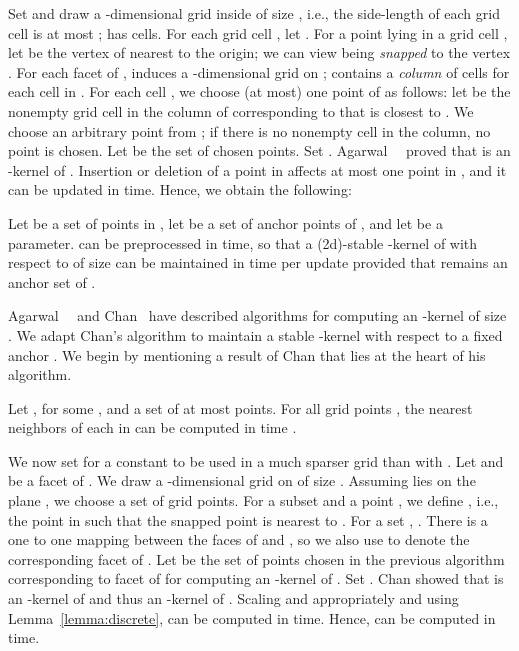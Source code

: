 \documentclass[11pt]{myclass}
\begin{document}
Set  and draw a -dimensional grid  inside
 of size , i.e., the side-length of each grid cell is
at most ;  has  cells. For each grid
cell , let . For a point  lying 
in a grid cell , 
let  be the vertex of  nearest to the origin; we can
view  being \emph{snapped} to the vertex .
For each facet  of ,
 induces a -dimensional grid  on ;  contains
a \emph{column} of cells for each cell in . For 
each cell , we choose (at most) one point of  
as follows:
let  be the nonempty grid cell in the column of  
corresponding to  that is closest to . We choose an 
arbitrary point from ;
if there is no nonempty cell in the column, no point is chosen. Let
 be the set of chosen points. Set . Agarwal~\etal~\cite{AHV04} proved that 
 is an -kernel of .  Insertion or deletion of a point
in  affects at most one point in , and it can be updated in 
 time. Hence, we obtain the following:

\begin{lemma}
Let  be a set of  points in , let 
 be a set of anchor points of , and let 
be a parameter.   can be preprocessed in  time,
so that a (2d)-stable -kernel of  with respect to  of 
size  can be maintained in  time 
per update provided that  remains an anchor set of .
\label{lem:weak-fixed}
\end{lemma}


Agarwal~\etal~\cite{AHV04} and Chan~\cite{Cha06} have described algorithms for 
computing an -kernel of size . We adapt Chan's 
algorithm to maintain a stable -kernel with respect to a 
fixed anchor . We begin by mentioning a result of Chan that lies 
at the heart of his algorithm.

\begin{lemma}
\label{lemma:discrete}
Let ,  for some , and
 a set of at most  points. For all grid points , the nearest
neighbors of each  in  can be computed in time .
\end{lemma}

We now set  for a constant  to be used in a much sparser grid than with . 
Let  and  be a facet of . 
We draw a -dimensional grid on  of size . 
Assuming  lies on the plane , we choose a set  of grid points.
For a subset  and a point , we define , i.e., the point in  such that the snapped point is nearest to . 
For a set , . 
There is a one to one mapping between the faces of  and , so we also use  to denote the corresponding facet of . 
Let  be the set of points chosen in the previous algorithm corresponding to facet  of  for computing an -kernel of . 
Set .  
Chan showed that  is an -kernel of  and thus an -kernel of . 
Scaling  and  appropriately and using Lemma~\ref{lemma:discrete},  can be computed in  time. Hence,  can be computed in  time.
\end{document}
